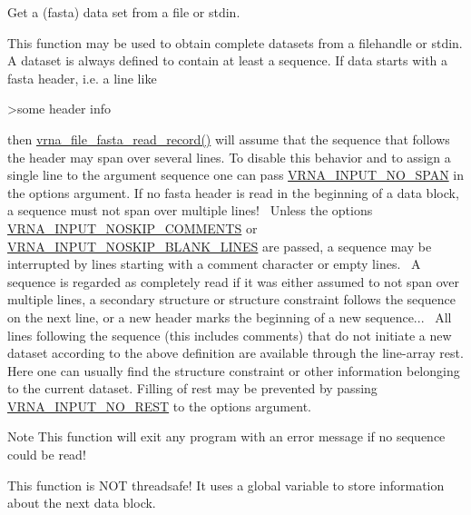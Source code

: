 Get a (fasta) data set from a file or stdin. 

This function may be used to obtain complete datasets from a filehandle or stdin. A dataset is always defined to contain at least a sequence. If data starts with a fasta header, i.\+e. a line like \begin{DoxyVerb}>some header info \end{DoxyVerb}
 then \hyperlink{group__file__utils_ga8cfb7e271efc9e1f34640acb85475639}{vrna\+\_\+file\+\_\+fasta\+\_\+read\+\_\+record()} will assume that the sequence that follows the header may span over several lines. To disable this behavior and to assign a single line to the argument \textquotesingle{}sequence\textquotesingle{} one can pass \hyperlink{group__utils_ga0de536599b881c787b0943a2671da476}{V\+R\+N\+A\+\_\+\+I\+N\+P\+U\+T\+\_\+\+N\+O\+\_\+\+S\+P\+A\+N} in the \textquotesingle{}options\textquotesingle{} argument. If no fasta header is read in the beginning of a data block, a sequence must not span over multiple lines!~\newline
 Unless the options \hyperlink{group__utils_ga0f6311f11bed1842e3a527ab27b294c6}{V\+R\+N\+A\+\_\+\+I\+N\+P\+U\+T\+\_\+\+N\+O\+S\+K\+I\+P\+\_\+\+C\+O\+M\+M\+E\+N\+T\+S} or \hyperlink{group__utils_gab4db885222b3b69608310d7c7e63e286}{V\+R\+N\+A\+\_\+\+I\+N\+P\+U\+T\+\_\+\+N\+O\+S\+K\+I\+P\+\_\+\+B\+L\+A\+N\+K\+\_\+\+L\+I\+N\+E\+S} are passed, a sequence may be interrupted by lines starting with a comment character or empty lines.~\newline
 A sequence is regarded as completely read if it was either assumed to not span over multiple lines, a secondary structure or structure constraint follows the sequence on the next line, or a new header marks the beginning of a new sequence...~\newline
 All lines following the sequence (this includes comments) that do not initiate a new dataset according to the above definition are available through the line-\/array \textquotesingle{}rest\textquotesingle{}. Here one can usually find the structure constraint or other information belonging to the current dataset. Filling of \textquotesingle{}rest\textquotesingle{} may be prevented by passing \hyperlink{group__utils_ga7a2e8c50a0c7ce82e60da1016e1367fd}{V\+R\+N\+A\+\_\+\+I\+N\+P\+U\+T\+\_\+\+N\+O\+\_\+\+R\+E\+S\+T} to the options argument.~\newline
 \begin{DoxyNote}{Note}
This function will exit any program with an error message if no sequence could be read! 

This function is N\+O\+T threadsafe! It uses a global variable to store information about the next data block.
\end{DoxyNote}
